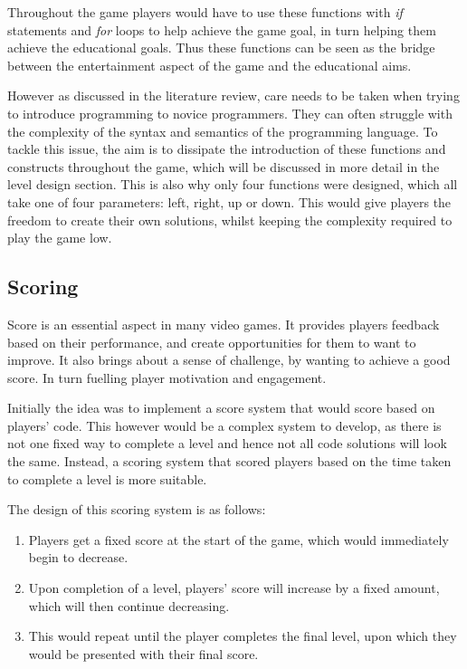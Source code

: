 \documentclass[a4paper,11.5pt]{report}
\numberwithin{figure}{section}
\numberwithin{table}{section}
\numberwithin{equation}{section}
\numberwithin{equation}{section}
\begin{document}
Throughout the game players would have to use these functions with \textit{if} statements and \textit{for} loops to help achieve the game goal, in turn helping them achieve the educational goals. Thus these functions can be seen as the bridge between the entertainment aspect of the game and the educational aims. 

However as discussed in the literature review, care needs to be taken when trying to introduce programming to novice programmers. They can often struggle with the complexity of the syntax and semantics of the programming language. To tackle this issue, the aim is to dissipate the introduction of these functions and constructs throughout the game, which will be discussed in more detail in the level design section. This is also why only four functions were designed, which all take one of four parameters: left, right, up or down. This would give players the freedom to create their own solutions, whilst keeping the complexity required to play the game low.

\subsection{Scoring}

Score is an essential aspect in many video games. It provides players feedback based on their performance, and create opportunities for them to want to improve. It also brings about a sense of challenge, by wanting to achieve a good score. In turn fuelling player motivation and engagement.

Initially the idea was to implement a score system that would score based on players' code. This however would be a complex system to develop, as there is not one fixed way to complete a level and hence not all code solutions will look the same. Instead, a scoring system that scored players based on the time taken to complete a level is more suitable.

The design of this scoring system is as follows:

\begin{enumerate}
	\item Players get a fixed score at the start of the game, which would immediately begin to decrease. 
	\item Upon completion of a level, players' score will increase by a fixed amount, which will then continue decreasing.
	\item This would repeat until the player completes the final level, upon which they would be presented with their final score.
\end{enumerate}
\end{document}
